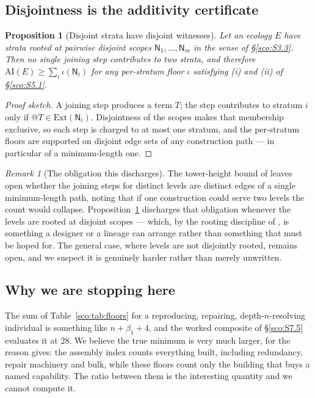 \documentclass[11pt]{article}
\makeatletter
\theoremstyle{plain}
\newtheorem{proposition}[theorem]{Proposition}
\theoremstyle{definition}
\theoremstyle{remark}
\newtheorem{remark}[theorem]{Remark}
\newcommand{\Nsp}{\mathsf{N}}
\newcommand{\quo}[1]{@#1}
\newcommand{\AI}{\mathrm{AI}}
\newcommand{\bt}{\beta_1}
\newcommand{\Ext}{\mathrm{Ext}}
\makeatother
\begin{document}
\subsection{Disjointness is the additivity certificate}\label{sco:S5.7}

\begin{proposition}[Disjoint strata have disjoint witnesses]
\label{sco:prop:disjointedges}
Let an ecology $E$ have strata rooted at pairwise disjoint scopes
$\Nsp_1, \dots, \Nsp_m$ in the sense of \S\ref{sco:S3.3}. Then no single
joining step contributes to two strata, and therefore
$\AI(E) \ge \sum_i \iota(\Nsp_i)$ for any per-stratum floor $\iota$
satisfying (i) and (ii) of \S\ref{sco:S5.1}.
\end{proposition}

\begin{proof}[Proof sketch]
A joining step produces a term $T$; the step contributes to stratum $i$
only if $\quo{T} \in \Ext(\Nsp_i)$. Disjointness of the scopes makes that
membership exclusive, so each step is charged to at most one stratum, and
the per-stratum floors are supported on disjoint edge sets of any
construction path --- in particular of a minimum-length one.
\end{proof}

\begin{remark}[The obligation this discharges]\label{sco:rem:obligation}
The tower-height bound of \cite[Ch.~44]{book} leaves open whether the
joining steps for distinct levels are distinct edges of a single
minimum-length path, noting that if one construction could serve two
levels the count would collapse. Proposition~\ref{sco:prop:disjointedges}
discharges that obligation whenever the levels are rooted at disjoint
scopes --- which, by the rooting discipline of \cite[\S9]{compose}, is
something a designer or a lineage can arrange rather than something that
must be hoped for. The general case, where levels are not disjointly
rooted, remains open, and we suspect it is genuinely harder rather than
merely unwritten.
\end{remark}

\subsection{Why we are stopping here}\label{sco:S5.8}

The sum of Table~\ref{sco:tab:floors} for a reproducing, repairing,
depth-$n$-resolving individual is something like $n + \bt + 4$, and the
worked composite of \S\ref{sco:S7.5} evaluates it at $28$. We believe the
true minimum is very much larger, for the reason
\cite[Rem.~44.2]{book} gives: the assembly index counts everything built,
including redundancy, repair machinery and bulk, while these floors count
only the building that buys a named capability. The ratio between them is
the interesting quantity and we cannot compute it.
\end{document}
